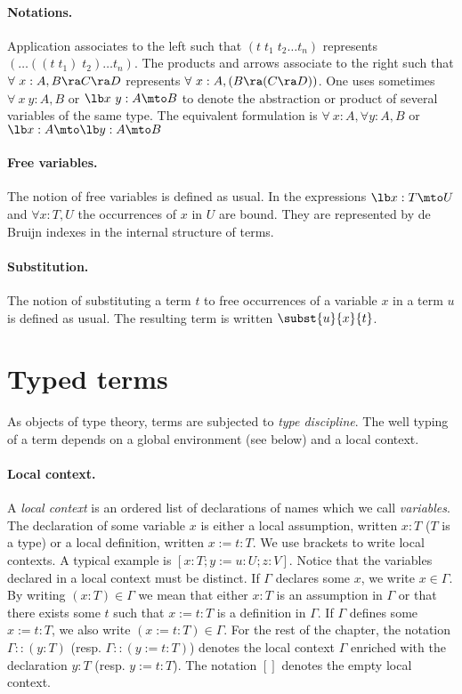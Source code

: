 \paragraph{Notations.} Application associates to the left such that
$(t\;t_1\;t_2\ldots t_n)$ represents $(\ldots ((t\;t_1)\;t_2)\ldots t_n)$. The
products and arrows associate to the right such that $\forall~x:A,B\ra C\ra
D$ represents $\forall~x:A,(B\ra (C\ra D))$.  One uses sometimes
$\forall~x~y:A,B$ or
$\lb x~y:A\mto B$ to denote the abstraction or product of several variables
of the same type. The equivalent formulation is $\forall~x:A, \forall y:A,B$ or
$\lb x:A \mto \lb y:A \mto B$

\paragraph{Free variables.}
The notion of free variables is defined as usual.  In the expressions
$\lb x:T\mto U$ and $\forall x:T, U$ the occurrences of $x$ in $U$
are bound.  They are represented by de Bruijn indexes in the internal
structure of terms.

\paragraph[Substitution.]{Substitution.}
The notion of substituting a term $t$ to free occurrences of a
variable $x$ in a term $u$ is defined as usual. The resulting term
is written $\subst{u}{x}{t}$.


\section[Typed terms]{Typed terms\label{Typed-terms}}

As objects of type theory, terms are subjected to {\em type
discipline}. The well typing of a term depends on
a global environment (see below) and a local context.

\paragraph{Local context.}
A {\em local context} is an ordered list of
declarations of names which we call {\em variables}.
The declaration of some variable $x$ is
either a local assumption, written $x:T$ ($T$ is a type) or a local definition,
written $x:=t:T$.  We use brackets to write local contexts. A
typical example is $[x:T;y:=u:U;z:V]$.  Notice that the variables
declared in a local context must be distinct. If $\Gamma$ declares some $x$,
we write $x \in \Gamma$. By writing $(x:T) \in \Gamma$ we mean that
either $x:T$ is an assumption in $\Gamma$ or that there exists some $t$ such
that $x:=t:T$ is a definition in $\Gamma$. If $\Gamma$ defines some
$x:=t:T$, we also write $(x:=t:T) \in \Gamma$.
For the rest of the chapter, the
notation $\Gamma::(y:T)$ (resp. $\Gamma::(y:=t:T)$) denotes the local context
$\Gamma$ enriched with the declaration $y:T$ (resp. $y:=t:T$). The
notation $[]$ denotes the empty local context.  

